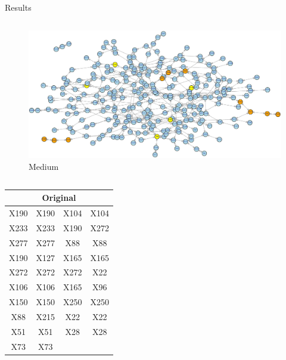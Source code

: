 \documentclass[final]{beamer} %
\newcommand{\boz}{\cellcolor{pathwaynode}}
\newcommand{\ghool}{\cellcolor{independentnode}}
\begin{document}
\begin{frame}{}
\begin{block}{Results}
\begin{columns}
        \begin{column}{0.25\textwidth}
          \begin{figure}
            \includegraphics[width=\textwidth]{synthesized-medium}
            \caption{\tiny Medium}
          \end{figure}
          \begin{columns}
            \begin{column}{0.5\textwidth}
              \center
              \tiny
              \begin{tabular}{| c c || c c |}
                \hline
                \toprule
                \multicolumn{4}{c}{Original} \\ 
                \midrule \hline
                \boz X190   &  \boz X190 &
                X104   &  X104  \\ \hline
                X233   &  X233  &
                \boz X190   &  \boz X272  \\ \hline
                X277   &  X277  &
                \ghool X88   &  \ghool X88  \\ \hline
                \boz X190   &  X127  &
                X165   &  X165  \\ \hline
                \boz X272   &  \boz X272 &
                \boz X272   &  \boz X22  \\ \hline
                X106   &  X106  &
                X165   &  \ghool X96  \\ \hline
                \boz X150   &  \boz X150  &
                X250   &  X250  \\ \hline
                \ghool X88   &  X215  &
                \boz X22   &  \boz X22  \\ \hline
                X51   &  X51  &
                X28   &  X28  \\ \hline
                X73   &  X73  &

\end{tabular}
\end{column}
\end{columns}
\end{column}
\end{columns}
\end{block}
\end{frame}
\end{document}
